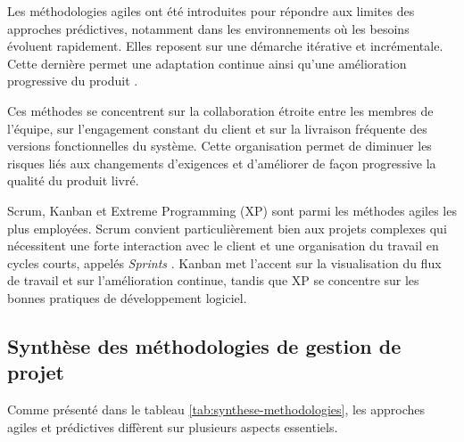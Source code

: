 Les méthodologies agiles ont été introduites pour répondre aux limites des approches prédictives, notamment dans les environnements où les besoins évoluent rapidement. Elles reposent sur une démarche itérative et incrémentale. Cette dernière permet une adaptation continue ainsi qu’une amélioration progressive du produit \parencite{agilemanifesto}.

Ces méthodes se concentrent sur la collaboration étroite entre les membres de l'équipe, sur l'engagement constant du client et sur la livraison fréquente des versions fonctionnelles du système. Cette organisation permet de diminuer les risques liés aux changements d’exigences et d’améliorer de façon progressive la qualité du produit livré.

Scrum, Kanban et Extreme Programming (XP) sont parmi les méthodes agiles les plus employées. Scrum convient particulièrement bien aux projets complexes qui nécessitent une forte interaction avec le client et une organisation du travail en cycles courts, appelés \textit{Sprints} \parencite{schwaber2020}. Kanban met l’accent sur la visualisation du flux de travail et sur l’amélioration continue, tandis que XP se concentre sur les bonnes pratiques de développement logiciel.



 













 
\subsection{Synthèse des méthodologies de gestion de projet}

Comme présenté dans le tableau \autoref{tab:synthese-methodologies}, les approches agiles et prédictives diffèrent sur plusieurs aspects essentiels.

